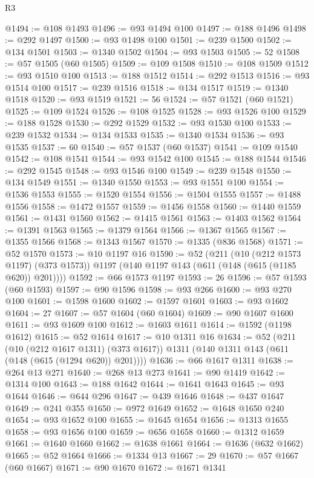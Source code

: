 \begin{lexlean}{R3}
\begin{coremodule}
@1494 := @108 @1493
@1496 := @93 @1494 @100
@1497 := @188 @1496
@1498 := @292 @1497
@1500 := @93 @1498 @100
@1501 := @239 @1500
@1502 := @134 @1501
@1503 := @1340 @1502
@1504 := @93 @1503
@1505 := 52
@1508 := @57 @1505 (@60 @1505)
@1509 := @109 @1508
@1510 := @108 @1509
@1512 := @93 @1510 @100
@1513 := @188 @1512
@1514 := @292 @1513
@1516 := @93 @1514 @100
@1517 := @239 @1516
@1518 := @134 @1517
@1519 := @1340 @1518
@1520 := @93 @1519
@1521 := 56
@1524 := @57 @1521 (@60 @1521)
@1525 := @109 @1524
@1526 := @108 @1525
@1528 := @93 @1526 @100
@1529 := @188 @1528
@1530 := @292 @1529
@1532 := @93 @1530 @100
@1533 := @239 @1532
@1534 := @134 @1533
@1535 := @1340 @1534
@1536 := @93 @1535
@1537 := 60
@1540 := @57 @1537 (@60 @1537)
@1541 := @109 @1540
@1542 := @108 @1541
@1544 := @93 @1542 @100
@1545 := @188 @1544
@1546 := @292 @1545
@1548 := @93 @1546 @100
@1549 := @239 @1548
@1550 := @134 @1549
@1551 := @1340 @1550
@1553 := @93 @1551 @100
@1554 := @1536 @1553
@1555 := @1520 @1554
@1556 := @1504 @1555
@1557 := @1488 @1556
@1558 := @1472 @1557
@1559 := @1456 @1558
@1560 := @1440 @1559
@1561 := @1431 @1560
@1562 := @1415 @1561
@1563 := @1403 @1562
@1564 := @1391 @1563
@1565 := @1379 @1564
@1566 := @1367 @1565
@1567 := @1355 @1566
@1568 := @1343 @1567
@1570 := @1335 (@836 @1568)
@1571 := @52 @1570
@1573 := @10 @1197 @16
@1590 := @52
    (@211
      (@10 (@212 @1573 @1197) (@373 @1573))
      @1197
      (@140 @1197 @143 (@611 (@148 (@615 (@1185 @620)) @201))))
@1592 := @66 @1573 @1197
@1593 := 26
@1596 := @57 @1593 (@60 @1593)
@1597 := @90 @1596
@1598 := @93 @266
@1600 := @93 @270 @100
@1601 := @1598 @1600
@1602 := @1597 @1601
@1603 := @93 @1602
@1604 := 27
@1607 := @57 @1604 (@60 @1604)
@1609 := @90 @1607 @1600
@1611 := @93 @1609 @100
@1612 := @1603 @1611
@1614 := @1592 (@1198 @1612)
@1615 := @52 @1614
@1617 := @10 @1311 @16
@1634 := @52
    (@211
      (@10 (@212 @1617 @1311) (@373 @1617))
      @1311
      (@140 @1311 @143 (@611 (@148 (@615 (@1294 @620)) @201))))
@1636 := @66 @1617 @1311
@1638 := @264 @13 @271
@1640 := @268 @13 @273
@1641 := @90 @1419
@1642 := @1314 @100
@1643 := @188 @1642
@1644 := @1641 @1643
@1645 := @93 @1644
@1646 := @644 @296
@1647 := @439 @1646
@1648 := @437 @1647
@1649 := @241 @355
@1650 := @972 @1649
@1652 := @1648 @1650 @240
@1654 := @93 @1652 @100
@1655 := @1645 @1654
@1656 := @1313 @1655
@1658 := @93 @1656 @100
@1659 := @656 @1658
@1660 := @1312 @1659
@1661 := @1640 @1660
@1662 := @1638 @1661
@1664 := @1636 (@632 @1662)
@1665 := @52 @1664
@1666 := @1334 @13
@1667 := 29
@1670 := @57 @1667 (@60 @1667)
@1671 := @90 @1670
@1672 := @1671 @1341

\end{coremodule}
\end{lexlean}
